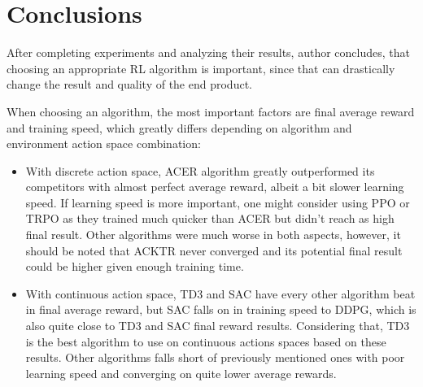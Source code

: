 \documentclass[12pt, a4paper]{article}
\begin{document}
\section*{Conclusions}

After completing experiments and analyzing their results, author concludes, that choosing an appropriate RL algorithm is important, since that can drastically change the result and quality of the end product. 

When choosing an algorithm, the most important factors are final average reward and training speed, which greatly differs depending on algorithm and environment action space combination:
\begin{itemize}
  \item With discrete action space, ACER algorithm greatly outperformed its competitors with almost perfect average reward, albeit a bit slower learning speed. If learning speed is more important, one might consider using PPO or TRPO as they trained much quicker than ACER but didn't reach as high final result. Other algorithms were much worse in both aspects, however, it should be noted that ACKTR never converged and its potential final result could be higher given enough training time.
  \item With continuous action space, TD3 and SAC have every other algorithm beat in final average reward, but SAC falls on in training speed to DDPG, which is also quite close to TD3 and SAC final reward results. Considering that, TD3 is the best algorithm to use on continuous actions spaces based on these results. Other algorithms falls short of previously mentioned ones with poor learning speed and converging on quite lower average rewards. 
\end{itemize}

\newpage



\end{document}
